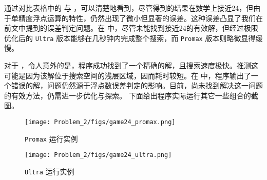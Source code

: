通过对比表格中的  与 ，可以清楚地看到，尽管得到的结果在数学上接近24，但由于单精度浮点运算的特性，仍然出现了微小但显著的误差。这种误差凸显了我们在前文中提到的误差判定问题。在  中，尽管未能找到接近24的有效解，但经过极限优化后的 \texttt{Ultra} 版本能够在几秒钟内完成整个搜索，而 \texttt{Promax} 版本则略微显得缓慢。

对于 ，令人意外的是，程序成功找到了一个精确的解，且搜索速度极快。推测这可能是因为该解位于搜索空间的浅层区域，因而耗时较短。在  中，程序输出了一个错误的解，问题仍然源于浮点数误差判定的影响。目前，尚未找到解决这一问题的有效方法，仍需进一步优化与探索。
下面给出程序实际运行其它一些组合的截图。

\begin{figure}[ht]
    \centering
    \texttt{[image: Problem\_2/figs/game24\_promax.png]}
    \caption{\texttt{Promax} 运行实例}
    \label{fig:promax}
\end{figure}

\begin{figure}[ht]
    \centering
    \texttt{[image: Problem\_2/figs/game24\_ultra.png]}
    \caption{\texttt{Ultra} 运行实例}
    \label{fig:Ultra}
\end{figure}




